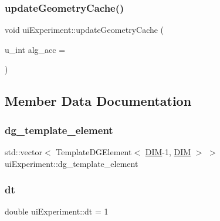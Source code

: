 \mbox{\label{classui_experiment_a406d18d100eaa0c03139590bfa6092af}} 
\subsubsection{\texorpdfstring{update\+Geometry\+Cache()}{updateGeometryCache()}\hspace{0.1cm}{\footnotesize\ttfamily [2/2]}}
{\footnotesize\ttfamily void ui\+Experiment\+::update\+Geometry\+Cache (\begin{DoxyParamCaption}\item[{u\+\_\+int}]{alg\+\_\+acc = {} }\end{DoxyParamCaption})}



\subsection{Member Data Documentation}
\mbox{\label{classui_experiment_ac5384376bf5ff36cb3d5784876972f4d}} 
\subsubsection{\texorpdfstring{dg\+\_\+template\+\_\+element}{dg\_template\_element}}
{\footnotesize\ttfamily std\+::vector$<$ Template\+D\+G\+Element$<$ \mbox{\hyperlink{complex__node___t_h_f_e_m_2uiexp_8h_a589b8b9bfdf714f736059845d568b597}{D\+IM}}-\/1, \mbox{\hyperlink{complex__node___t_h_f_e_m_2uiexp_8h_a589b8b9bfdf714f736059845d568b597}{D\+IM}} $>$ $>$ ui\+Experiment\+::dg\+\_\+template\+\_\+element\hspace{0.3cm}{\ttfamily [private]}}

\mbox{\label{classui_experiment_a636bedd4cd6e21255631fbaa556427f2}} 
\subsubsection{\texorpdfstring{dt}{dt}}
{\footnotesize\ttfamily double ui\+Experiment\+::dt = 1\hspace{0.3cm}{\ttfamily [private]}}



